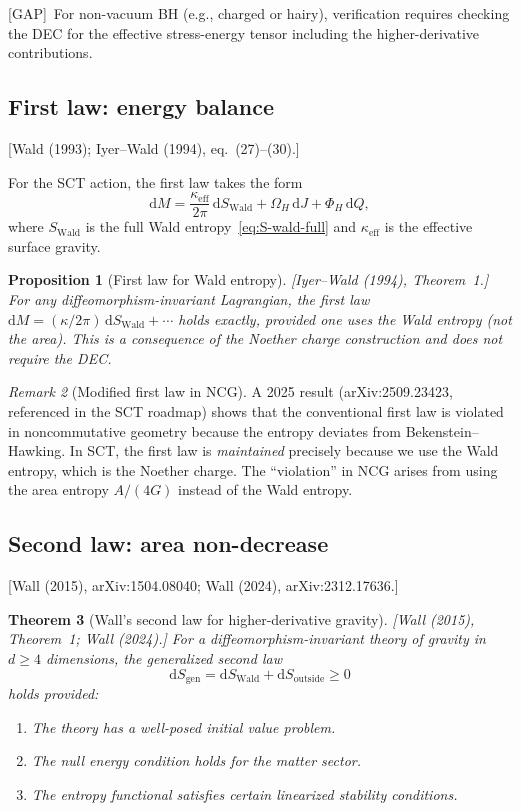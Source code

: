 \documentclass[12pt,a4paper]{article}
\newtheorem{proposition}{Proposition}[section]
\newtheorem{theorem}[proposition]{Theorem}
\theoremstyle{definition}
\theoremstyle{remark}
\newtheorem{remark}[proposition]{Remark}
\newcommand{\dd}{\mathrm{d}}
\newcommand{\fromlit}[1]{\textcolor{blue!70!black}{\textsf{[#1]}}}
\newcommand{\gap}{\textcolor{red!80!black}{\textsf{[GAP]}}}
\begin{document}
\gap\ For non-vacuum BH (e.g., charged or hairy), verification
requires checking the DEC for the effective stress-energy tensor
including the higher-derivative contributions.

\subsection{First law: energy balance}
\fromlit{Wald (1993); Iyer--Wald (1994), eq.~(27)--(30).}

For the SCT action, the first law takes the form
\begin{equation}\label{eq:first-law}
  \dd M = \frac{\kappa_{\mathrm{eff}}}{2\pi}\,
  \dd S_{\mathrm{Wald}} + \Omega_H\,\dd J + \Phi_H\,\dd Q,
\end{equation}
where $S_{\mathrm{Wald}}$ is the full Wald entropy~\eqref{eq:S-wald-full}
and $\kappa_{\mathrm{eff}}$ is the effective surface gravity.

\begin{proposition}[First law for Wald entropy]
\fromlit{Iyer--Wald (1994), Theorem~1.}
For any diffeomorphism-invariant Lagrangian, the first law
$\dd M = (\kappa/2\pi)\,\dd S_{\mathrm{Wald}} + \cdots$ holds
\emph{exactly}, provided one uses the Wald entropy (not the area).
This is a consequence of the Noether charge construction and does
not require the DEC.
\end{proposition}

\begin{remark}[Modified first law in NCG]
A 2025 result (arXiv:2509.23423, referenced in the SCT roadmap)
shows that the conventional first law is violated in noncommutative
geometry because the entropy deviates from Bekenstein--Hawking.
In SCT, the first law is \emph{maintained} precisely because we
use the Wald entropy, which is the Noether charge.  The ``violation''
in NCG arises from using the area entropy $A/(4G)$ instead of the
Wald entropy.
\end{remark}

\subsection{Second law: area non-decrease}
\fromlit{Wall (2015), arXiv:1504.08040;
Wall (2024), arXiv:2312.17636.}

\begin{theorem}[Wall's second law for higher-derivative gravity]
\fromlit{Wall (2015), Theorem~1; Wall (2024).}
For a diffeomorphism-invariant theory of gravity in $d \geq 4$
dimensions, the generalized second law
\begin{equation}
  \dd S_{\mathrm{gen}} = \dd S_{\mathrm{Wald}}
  + \dd S_{\mathrm{outside}} \geq 0
\end{equation}
holds provided:
\begin{enumerate}[nosep]
  \item The theory has a well-posed initial value problem.
  \item The null energy condition holds for the matter sector.
  \item The entropy functional satisfies certain linearized stability
    conditions.
\end{enumerate}
\end{theorem}
\end{document}
